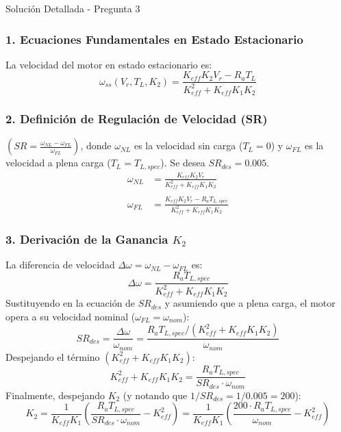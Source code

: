 \documentclass[12pt]{article}
\begin{document}
\begin{solutionbox}{Solución Detallada - Pregunta 3}
\subsubsection*{1. Ecuaciones Fundamentales en Estado Estacionario}
La velocidad del motor en estado estacionario es:
\begin{equation}
    \omega_{ss}(V_r, T_L, K_2) = \frac{K_{eff}K_2 V_r - R_a T_L}{K_{eff}^2 + K_{eff}K_1K_2}
\end{equation}

\subsubsection*{2. Definición de Regulación de Velocidad (SR)}
$(SR = \frac{\omega_{NL} - \omega_{FL}}{\omega_{FL}})$, donde $\omega_{NL}$ es la velocidad sin carga ($T_L=0$) y $\omega_{FL}$ es la velocidad a plena carga ($T_L=T_{L,spec}$). Se desea $SR_{des} = 0.005$.
\begin{align*}
    \omega_{NL} &= \frac{K_{eff}K_2 V_r}{K_{eff}^2 + K_{eff}K_1K_2} \\\\
    \omega_{FL} &= \frac{K_{eff}K_2 V_r - R_a T_{L,spec}}{K_{eff}^2 + K_{eff}K_1K_2}
\end{align*}

\subsubsection*{3. Derivación de la Ganancia $K_2$}
La diferencia de velocidad $\Delta\omega = \omega_{NL} - \omega_{FL}$ es:
\[ \Delta\omega = \frac{R_a T_{L,spec}}{K_{eff}^2 + K_{eff}K_1K_2} \]
Sustituyendo en la ecuación de $SR_{des}$ y asumiendo que a plena carga, el motor opera a su velocidad nominal ($\omega_{FL} = \omega_{nom}$):
\[ SR_{des} = \frac{\Delta\omega}{\omega_{nom}} = \frac{R_a T_{L,spec} / (K_{eff}^2 + K_{eff}K_1K_2)}{\omega_{nom}} \]
Despejando el término $(K_{eff}^2 + K_{eff}K_1K_2)$:
\[ K_{eff}^2 + K_{eff}K_1K_2 = \frac{R_a T_{L,spec}}{SR_{des} \cdot \omega_{nom}} \]
Finalmente, despejando $K_2$ (y notando que $1/SR_{des} = 1/0.005 = 200$):
\begin{equation}\label{eq:K2_calc}
    K_2 = \frac{1}{K_{eff}K_1} \left( \frac{R_a T_{L,spec}}{SR_{des} \cdot \omega_{nom}} - K_{eff}^2 \right) = \frac{1}{K_{eff}K_1} \left( \frac{200 \cdot R_a T_{L,spec}}{\omega_{nom}} - K_{eff}^2 \right)
\end{equation}


\end{solutionbox}
\end{document}
